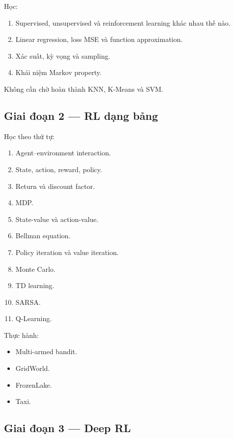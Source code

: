 \documentclass[12pt,a4paper]{article}
\begin{document}
Học:

\begin{enumerate}[leftmargin=1.8em]
    \item Supervised, unsupervised và reinforcement learning khác nhau thế nào.
    \item Linear regression, loss MSE và function approximation.
    \item Xác suất, kỳ vọng và sampling.
    \item Khái niệm Markov property.
\end{enumerate}

Không cần chờ hoàn thành KNN, K-Means và SVM.

\subsection{Giai đoạn 2 --- RL dạng bảng}

Học theo thứ tự:

\begin{enumerate}[leftmargin=1.8em]
    \item Agent--environment interaction.
    \item State, action, reward, policy.
    \item Return và discount factor.
    \item MDP.
    \item State-value và action-value.
    \item Bellman equation.
    \item Policy iteration và value iteration.
    \item Monte Carlo.
    \item TD learning.
    \item SARSA.
    \item Q-Learning.
\end{enumerate}

Thực hành:

\begin{itemize}[leftmargin=1.5em]
    \item Multi-armed bandit.
    \item GridWorld.
    \item FrozenLake.
    \item Taxi.
\end{itemize}

\subsection{Giai đoạn 3 --- Deep RL}
\end{document}
